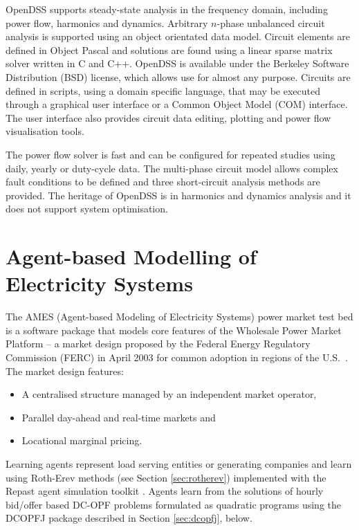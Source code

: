 OpenDSS supports steady-state analysis in the frequency domain, including power
flow, harmonics and dynamics.  Arbitrary $n$-phase unbalanced circuit analysis
is supported using an object orientated data model.  Circuit elements are
defined in Object Pascal and solutions are found using a linear sparse matrix
solver written in C and C++.  OpenDSS is available under the Berkeley Software
Distribution (BSD) license, which allows use for almost any purpose.  Circuits
are defined in scripts, using a domain specific language, that may be executed
through a graphical user interface or a Common Object Model (COM) interface.
The user interface also provides circuit data editing, plotting and power flow
visualisation tools.

The power flow solver is fast and can be configured for repeated
studies using daily, yearly or duty-cycle data.  The multi-phase circuit model allows
complex fault conditions to be defined and three short-circuit analysis methods
are provided.  The heritage of OpenDSS is in harmonics and dynamics analysis
and it does not support system optimisation.

\section{Agent-based Modelling of Electricity Systems}
\label{sec:ames}
The AMES (Agent-based Modeling of Electricity Systems) power market test bed is
a software package that models core features of the Wholesale Power Market
Platform -- a market design proposed by the Federal Energy Regulatory
Commission (FERC) in April 2003 for common adoption in regions of the
U.S.~\cite{tesfatsi:wpmp}. The market design features:
\begin{itemize}
  \item A centralised structure managed by an independent market operator,
  \item Parallel day-ahead and real-time markets and
  \item Locational marginal pricing.
\end{itemize}
Learning agents represent load serving entities or generating companies and
learn using Roth-Erev methods (see Section \ref{sec:rotherev})
implemented with the Repast agent simulation toolkit \cite{gieseler:thesis}.
Agents learn from the solutions of hourly bid/offer based
DC-OPF problems formulated as quadratic programs using the DCOPFJ package
\cite{tesfatsi:dcopf} described in Section \ref{sec:dcopfj}, below.


